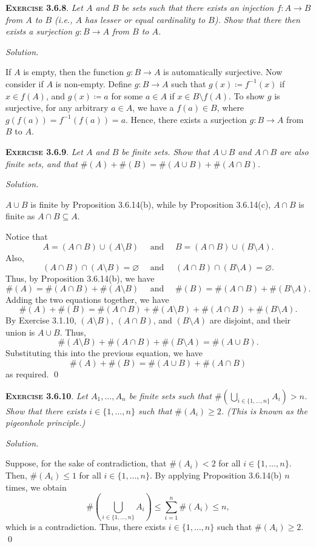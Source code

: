 \documentclass[12pt]{article}
\theoremstyle{remark}
\newenvironment{exer}[2]{
    \noindent \setlength{\parskip}{1em}%
    \textsc{\textbf{Exercise #1}}. \textit{#2} \par
    \noindent \textit{Solution.} %
}{\bigskip}
\begin{document}
\begin{exer}{3.6.8}{
    Let $A$ and $B$ be sets such that there exists an injection $f : A \to B$ from $A$ to $B$ (i.e., $A$ has lesser or equal cardinality to $B$).
    Show that there then exists a surjection $g : B \to A$ from $B$ to $A$.
}
    If $A$ is empty, then the function $g : B \to A$ is automatically surjective.
    Now consider if $A$ is non-empty.
    Define $g : B \to A$ such that $g(x) \coloneqq f^{-1}(x)$ if $x \in f(A)$, and $g(x) \coloneqq a$ for some $a \in A$ if $x \in B \setminus f(A)$.
    To show $g$ is surjective, for any arbitrary $a \in A$, we have a $f(a) \in B$, where $g(f(a)) = f^{-1}(f(a)) = a$.
    Hence, there exists a surjection $g : B \to A$ from $B$ to $A$.
\end{exer}


\begin{exer}{3.6.9}{
    Let $A$ and $B$ be finite sets.
    Show that $A \cup B$ and $A \cap B$ are also finite sets, and that $\#(A) + \#(B) = \#(A \cup B) + \#(A \cap B)$.
}
    $A \cup B$ is finite by Proposition 3.6.14(b), while by Proposition 3.6.14(c), $A \cap B$ is finite as $A \cap B \subseteq A$.

    Notice that
    \[
        A = (A \cap B) \cup (A \setminus B) \quad \text{ and } \quad B = (A \cap B) \cup (B \setminus A).
    \]
    Also,
    \[
        (A \cap B) \cap (A \setminus B) = \varnothing \quad \text{ and } \quad (A \cap B) \cap (B \setminus A) = \varnothing.
    \]
    Thus, by Proposition 3.6.14(b), we have
    \[
        \#(A) = \#(A \cap B) + \#(A \setminus B) \quad \text{ and } \quad \#(B) = \#(A \cap B) + \#(B \setminus A).
    \]
    Adding the two equations together, we have
    \[
        \#(A) + \#(B) = \#(A \cap B) + \#(A \setminus B) + \#(A \cap B) + \#(B \setminus A).
    \]
    By Exercise 3.1.10, $(A \setminus B)$, $(A \cap B)$, and $(B \setminus A)$ are disjoint, and their union is $A \cup B$.
    Thus,
    \[
        \#(A \setminus B) + \#(A \cap B) + \#(B \setminus A) = \#(A \cup B).
    \]
    Substituting this into the previous equation, we have 
    \[
        \#(A) + \#(B) = \#(A \cup B) + \#(A \cap B)
    \]
    as required. \qed
    
\end{exer}


\begin{exer}{3.6.10}{
    Let $A_1, \ldots, A_n$ be finite sets such that $\#(\bigcup_{i \in \{1,\ldots,n\}} A_i) > n$.
    Show that there exists $i \in \{1, \ldots ,n \}$ such that $\#(A_i) \ge 2$.
    (This is known as the \emph{pigeonhole principle}.)
}
    Suppose, for the sake of contradiction, that $\#(A_i) < 2$ for all $i \in \{1, \ldots ,n \}$.
    Then, $\#(A_i) \le 1$ for all $i \in \{1, \ldots ,n \}$.
    By applying Proposition 3.6.14(b) $n$ times, we obtain 
    \[
        \# \left( \bigcup_{i \in \{1,\ldots,n\}} A_i \right) \le \sum^n_{i=1} \#(A_i) \le n,
    \]
    which is a contradiction.
    Thus, there exists $i \in \{1, \ldots ,n \}$ such that $\#(A_i) \ge 2$. \qed
\end{exer}
\end{document}
